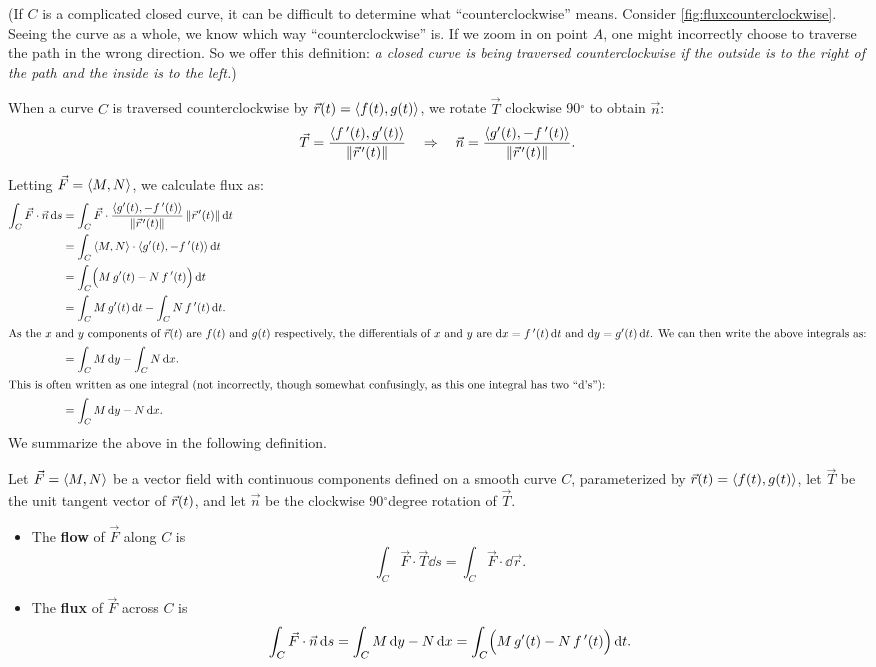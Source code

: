 (If $C$ is a complicated closed curve, it can be difficult to determine what ``counterclockwise'' means. Consider \autoref{fig:fluxcounterclockwise}. Seeing the curve as a whole, we know which way ``counterclockwise'' is. If we zoom in on point $A$, one might incorrectly choose to traverse the path in the wrong direction. So we offer this definition: \emph{a closed curve is being traversed counterclockwise if the outside is to the right of the path and the inside is to the left.})

When a curve $C$ is traversed counterclockwise by $\vec r(t) =\left\langle f(t), g(t)\right\rangle$, we rotate $\vec T$ clockwise 90$^\circ$  to obtain $\vec n$:
\[
\vec T = \frac{\left\langle f\,'(t),g'(t)\right\rangle}{\left\lVert \vec r\hskip1.25pt '(t) \right\rVert} \quad \Rightarrow \quad \vec n = \frac{\left\langle g'(t),-f\,'(t)\right\rangle}{\left\lVert \vec r\hskip1.25pt '(t) \right\rVert}.
\]

Letting $\vec F =\left\langle M,N\right\rangle$, we calculate flux as:
\begin{align*}
\int_C \vec F\cdot \vec n\dd s &= \int_C \vec F\cdot \frac{\bracket{g'(t),-\fp(t)}}{\norm{\vrp(t)}} \norm{\vrp(t)}\dd t \\
				&= \int_C\bracket{M,N}\cdot\bracket{g'(t),-\fp(t)}\dd t \\
				&= \int_C \Bigl(M\,g'(t) - N\,\fp(t)\Bigr)\dd t\\
				&= \int_C M\,g'(t)\dd t - \int_C N\,\fp(t)\dd t.\\
				\intertext{As the \intertextmath{x} and \intertextmath{y} components of \intertextmath{\vrt} are \intertextmath{f(t)} and \intertextmath{g(t)} respectively, the differentials of \intertextmath{x} and \intertextmath{y} are \intertextmath{\dd x = \fp(t)\dd t} and \intertextmath{\dd y=g'(t)\dd t}. We can then write the above integrals as:}
				&= \int_C M\dd y - \int_C N\dd x.\\
				\intertext{This is often written as one integral (not incorrectly, though somewhat confusingly, as this one integral has two ``\intertextmath{\dd}\,'s''):}
				&=\int_CM\dd y -N\dd x.
\end{align*}
We summarize the above in the following definition.

\begin{definition}\label{def:flowflux}%
Let $\vec F=\left\langle M,N\right\rangle$ be a vector field with continuous components defined on a smooth curve $C$, parameterized by $\vec r(t) =\left\langle f(t),g(t)\right\rangle$, let $\vec T$ be the unit tangent vector of $\vec r(t)$, and let $\vec n$ be the clockwise 90$^\circ$degree rotation of $\vec T$.
\begin{itemize}
	\item The \textbf{flow} of $\vec F$ along $C$ is
\[\int_C \vec F\cdot\vec T\dd s=\int_C \vec F\cdot\dd\vec r.\]
	\item The \textbf{flux} of $\vec F$ across $C$ is
\[
\int_C \vec F\cdot \vec n\operatorname{d}\! s =  \int_C M\operatorname{d}\! y -N\operatorname{d}\! x = \int_C\Bigl(M\,g'(t) - N\,f\,'(t)\Bigr)\operatorname{d}\! t.
\]
\end{itemize}
\end{definition}

